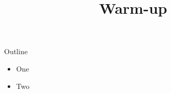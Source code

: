 \documentclass{beamer}
\title{Warm-up}
\begin{document}
\frame{\titlepage}
\begin{frame}{Outline}
\begin{itemize}
\item One
\item Two
\end{itemize}
\end{frame}
\end{document}
